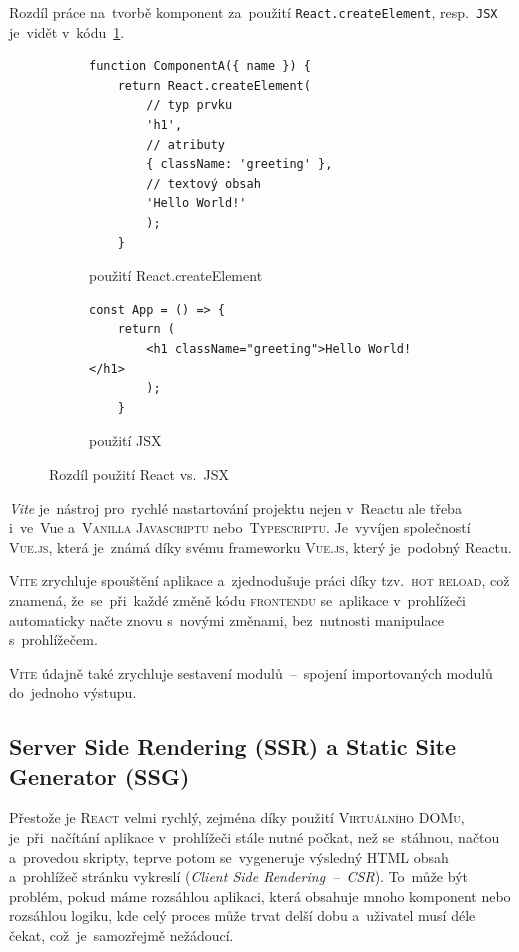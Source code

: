 \documentclass[14pt,a4paper]{article}
\begin{document}
        Rozdíl práce na~tvorbě komponent za~použití \texttt{React.createElement}, resp.~\texttt{JSX} je~vidět v~kódu~\ref{JSXcomponent}.
        \begin{figure}
            \begin{subfigure}[b]{0.45\linewidth}
                \begin{verbatim}
function ComponentA({ name }) {
    return React.createElement(
        // typ prvku
        'h1',
        // atributy
        { className: 'greeting' },
        // textový obsah
        'Hello World!'
        );
    }
\end{verbatim}
\caption{použití React.createElement}
\end{subfigure}
\hfill
\begin{subfigure}[b]{0.45\linewidth}
    \begin{verbatim}
const App = () => {
    return (
        <h1 className="greeting">Hello World!</h1>
        );
    }
\end{verbatim}
\vspace{1cm}
\caption{použití JSX}
\end{subfigure}
\label{JSXcomponent}
\caption{Rozdíl použití React vs.~JSX}
\end{figure}

\emph{Vite} je~nástroj pro~rychlé nastartování projektu nejen v~Reactu ale třeba i~ve~Vue a~\textsc{Vanilla Javascriptu} nebo~\textsc{Typescriptu}. Je~vyvíjen společností \textsc{Vue.js}, která je~známá díky svému frameworku \textsc{Vue.js}, který je~podobný Reactu.

\textsc{Vite} zrychluje spouštění aplikace a~zjednodušuje práci díky tzv.~\textsc{hot reload}, což znamená, že~se~při~každé změně kódu \textsc{frontendu} se~aplikace v~prohlížeči automaticky načte znovu s~novými změnami, bez~nutnosti manipulace s~prohlížečem.

\textsc{Vite} údajně také zrychluje sestavení modulů~--~spojení importovaných modulů do~jednoho výstupu.\cite{vitejs}

\subsection{Server Side Rendering (SSR) a Static Site Generator (SSG)}
Přestože je \textsc{React} velmi rychlý, zejména díky použití \textsc{Virtuálního DOMu}, je~při~načítání aplikace v~prohlížeči stále nutné počkat, než se~stáhnou, načtou a~provedou skripty, teprve potom se~vygeneruje výsledný \textsc{HTML} obsah a~prohlížeč stránku vykreslí (\emph{Client Side Rendering~--~CSR})\cite{mediumWhatCSR}. To~může být problém, pokud máme rozsáhlou aplikaci, která obsahuje mnoho komponent nebo rozsáhlou logiku, kde celý proces může trvat delší dobu a~uživatel musí déle čekat, což~je~samozřejmě nežádoucí.
\end{document}
